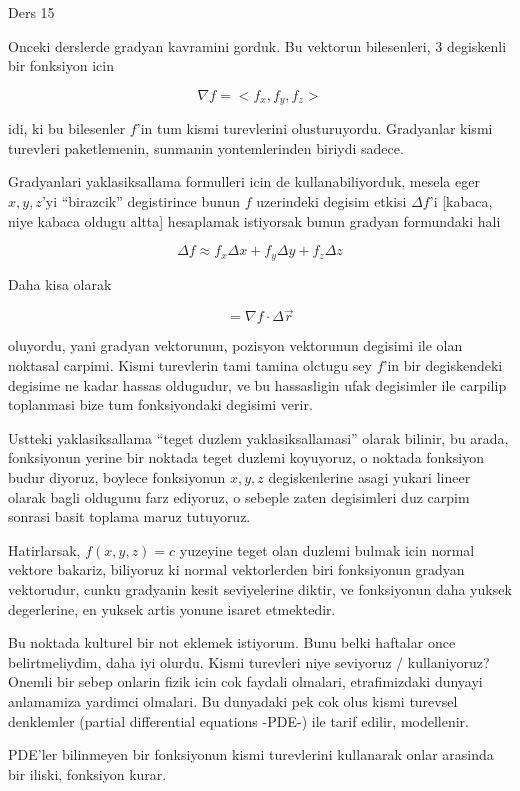 \documentclass[12pt,fleqn]{article}
\begin{document}
Ders 15

Onceki derslerde gradyan kavramini gorduk. Bu vektorun bilesenleri, 3
degiskenli bir fonksiyon icin

\[ \nabla f = <f_x, f_y, f_z> \]

idi, ki bu bilesenler $f$'in tum kismi turevlerini
olusturuyordu. Gradyanlar kismi turevleri paketlemenin, sunmanin
yontemlerinden biriydi sadece. 

Gradyanlari yaklasiksallama formulleri icin de kullanabiliyorduk, mesela
eger $x,y,z$'yi ``birazcik'' degistirince bunun $f$ uzerindeki degisim
etkisi $\Delta f$'i [kabaca, niye kabaca oldugu altta] hesaplamak
istiyorsak bunun gradyan formundaki hali

\[ \Delta f \approx f_x \Delta x + f_y \Delta y + f_z \Delta z \]

Daha kisa olarak 

\[ = \nabla f \cdot \Delta \vec{r} \]

oluyordu, yani gradyan vektorunun, pozisyon vektorunun degisimi ile olan
noktasal carpimi. Kismi turevlerin tami tamina olctugu sey $f$'in bir
degiskendeki degisime ne kadar hassas oldugudur, ve bu hassasligin ufak
degisimler ile carpilip toplanmasi bize tum fonksiyondaki degisimi verir.

Ustteki yaklasiksallama ``teget duzlem yaklasiksallamasi'' olarak bilinir,
bu arada, fonksiyonun yerine bir noktada teget duzlemi koyuyoruz, o noktada
fonksiyon budur diyoruz, boylece fonksiyonun $x,y,z$ degiskenlerine asagi
yukari lineer olarak bagli oldugunu farz ediyoruz, o sebeple zaten
degisimleri duz carpim sonrasi basit toplama maruz tutuyoruz. 

Hatirlarsak, $f(x,y,z)=c$ yuzeyine teget olan duzlemi bulmak icin normal
vektore bakariz, biliyoruz ki normal vektorlerden biri fonksiyonun gradyan
vektorudur, cunku gradyanin kesit seviyelerine diktir, ve fonksiyonun daha
yuksek degerlerine, en yuksek artis yonune isaret etmektedir. 

Bu noktada kulturel bir not eklemek istiyorum. Bunu belki haftalar once
belirtmeliydim, daha iyi olurdu. Kismi turevleri niye seviyoruz /
kullaniyoruz? Onemli bir sebep onlarin fizik icin cok faydali olmalari,
etrafimizdaki dunyayi anlamamiza yardimci olmalari. Bu dunyadaki pek cok
olus kismi turevsel denklemler (partial differential equations -PDE-) ile
tarif edilir, modellenir.

PDE'ler bilinmeyen bir fonksiyonun kismi turevlerini kullanarak onlar
arasinda bir iliski, fonksiyon kurar. 
\end{document}
